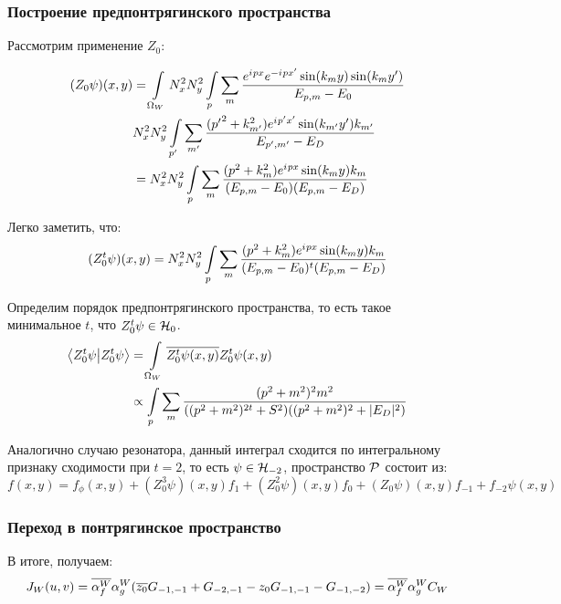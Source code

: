 \subsubsection{Построение предпонтрягинского пространства}
Рассмотрим применение $Z_0$:

\begin{align*}
(Z_0 \psi)(x, y)
&= \int\limits_{\Omega_W} N_x^2 N_y^2 \int\limits_p \sum\limits_m \frac{e^{{i\mkern1mu} p x} e^{-{i\mkern1mu} p x'} \sin(k_m y) \sin(k_m y')}{E_{p, m} - E_0} \\
&  N_x^2 N_y^2 \int\limits_{p'} \sum\limits_{m'} \frac{({p'}^2 + k_{m'}^2) e^{{i\mkern1mu} p' x'} \sin(k_{m'} y') k_{m'} }{E_{p', m'} - E_D} \\
&= N_x^2 N_y^2 \int\limits_p \sum\limits_m \frac{(p^2 + k_m^2) e^{{i\mkern1mu} p x} \sin(k_m y) k_m}{(E_{p, m} - E_0) (E_{p, m} - E_D)}
\end{align*}

Легко заметить, что:
\begin{align*}
(Z_0^t \psi)(x, y) =
N_x^2 N_y^2 \int\limits_p \sum\limits_m \frac{(p^2 + k_m^2) e^{{i\mkern1mu} p x} \sin(k_m y) k_m}{(E_{p, m} - E_0)^t (E_{p, m} - E_D)}
\end{align*}

Определим порядок предпонтрягинского пространства, то есть такое минимальное $t$, что $Z_0^t \psi \in \mathcal{H}_{0}$.
\begin{align*}
\ip{Z_0^t \psi}{Z_0^t \psi}
&= \int\limits_{\Omega_W} \cconj{Z_0^t \psi(x, y)} Z_0^t \psi(x, y) \\
&\propto \int\limits_p \sum\limits_m \frac{(p^2 + m^2)^2 m^2}{((p^2 + m^2)^{2t} + S^2 ) ((p^2 + m^2)^2 + |E_D|^2)}
\end{align*}

Аналогично случаю резонатора, данный интеграл сходится по интегральному признаку сходимости при $t = 2$, то есть $\psi \in \mathcal{H}_{-2}$, пространство $\mathcal{P}$ состоит из:
\[
f(x, y) = f_\phi(x, y) + (Z_0^3 \psi)(x, y) f_1 + (Z_0^2 \psi)(x, y) f_0 + (Z_0 \psi)(x, y) f_{-1} + f_{-2} \psi(x, y)
\]


\subsubsection{Переход в понтрягинское пространство}
В итоге, получаем:
\begin{align*}
J_W(u, v) = \overline{\alpha^W_f} \alpha^W_g (\overline{z_0} G_{-1, -1} + G_{-2, -1} - z_0 G_{-1, -1} - G_{-1, -2}) = \overline{\alpha^W_f} \alpha^W_g C_W
\end{align*}

